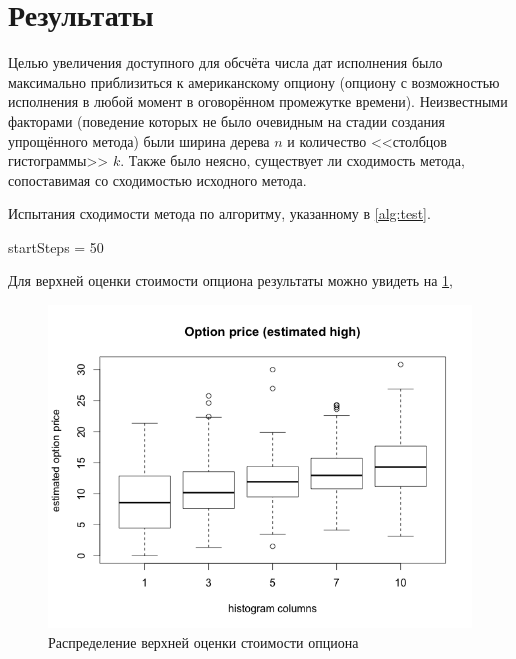 \documentclass[12pt,twoside,titlepage,сa4paper]{article}
\begin{document}
\section{Результаты}
	Целью увеличения доступного для обсчёта числа дат исполнения было максимально приблизиться к американскому опциону (опциону с возможностью исполнения в любой момент в оговорённом промежутке времени). Неизвестными факторами (поведение которых не было очевидным на стадии создания упрощённого метода) были ширина дерева $n$ и количество <<столбцов гистограммы>> $k$. Также было неясно, существует ли сходимость метода, сопоставимая со сходимостью исходного метода.
	\par Испытания сходимости метода по алгоритму, указанному в \ref{alg:test}.
	\begin{algorithm}
	\label{alg:test}
		\DontPrintSemicolon
		startSteps = 50\;
	\end{algorithm}
	\par Для верхней оценки стоимости опциона результаты можно увидеть на \ref{fig:upperEstimate},
	\begin{figure}[h]
		\includegraphics[width=\textwidth]{upper_estimate}
		\caption{Распределение верхней оценки стоимости опциона}
		\label{fig:upperEstimate}
	\end{figure}
\end{document}
